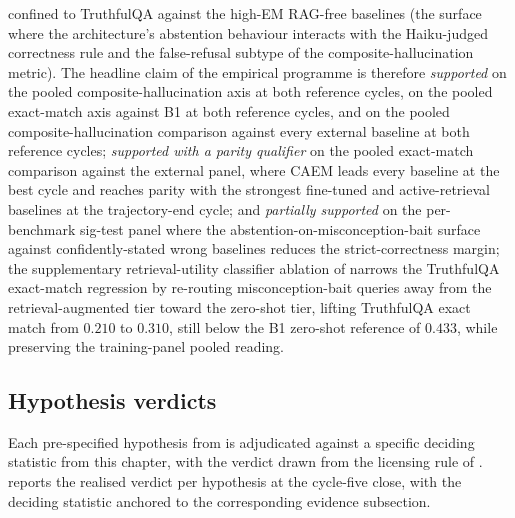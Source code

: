 confined to TruthfulQA against the high-EM RAG-free baselines (the surface where the architecture's abstention behaviour interacts with the Haiku-judged correctness rule and the false-refusal subtype of the composite-hallucination metric). The headline claim of the empirical programme is therefore \emph{supported} on the pooled composite-hallucination axis at both reference cycles, on the pooled exact-match axis against B1 at both reference cycles, and on the pooled composite-hallucination comparison against every external baseline at both reference cycles; \emph{supported with a parity qualifier} on the pooled exact-match comparison against the external panel, where CAEM leads every baseline at the best cycle and reaches parity with the strongest fine-tuned and active-retrieval baselines at the trajectory-end cycle; and \emph{partially supported} on the per-benchmark sig-test panel where the abstention-on-misconception-bait surface against confidently-stated wrong baselines reduces the strict-correctness margin; the supplementary retrieval-utility classifier ablation of  narrows the TruthfulQA exact-match regression by re-routing misconception-bait queries away from the retrieval-augmented tier toward the zero-shot tier, lifting TruthfulQA exact match from $0.210$ to $0.310$, still below the B1 zero-shot reference of $0.433$, while preserving the training-panel pooled reading.

\subsection{Hypothesis verdicts}
\label{sec:summary-hypotheses}

Each pre-specified hypothesis from  is adjudicated against a specific deciding statistic from this chapter, with the verdict drawn from the licensing rule of .  reports the realised verdict per hypothesis at the cycle-five close, with the deciding statistic anchored to the corresponding evidence subsection.

